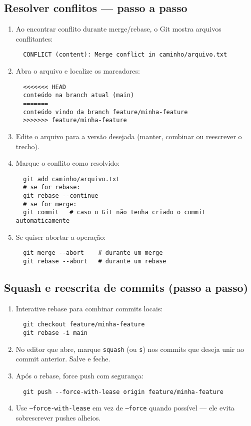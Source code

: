 \subsection{Resolver conflitos — passo a passo}
\begin{enumerate}
  \item Ao encontrar conflito durante merge/rebase, o Git mostra arquivos conflitantes:
  \begin{verbatim}
  CONFLICT (content): Merge conflict in caminho/arquivo.txt
  \end{verbatim}
  \item Abra o arquivo e localize os marcadores:
  \begin{verbatim}
  <<<<<<< HEAD
  conteúdo na branch atual (main)
  =======
  conteúdo vindo da branch feature/minha-feature
  >>>>>>> feature/minha-feature
  \end{verbatim}
  \item Edite o arquivo para a versão desejada (manter, combinar ou reescrever o trecho).
  \item Marque o conflito como resolvido:
  \begin{verbatim}
  git add caminho/arquivo.txt
  # se for rebase:
  git rebase --continue
  # se for merge:
  git commit   # caso o Git não tenha criado o commit automaticamente
  \end{verbatim}
  \item Se quiser abortar a operação:
  \begin{verbatim}
  git merge --abort    # durante um merge
  git rebase --abort   # durante um rebase
  \end{verbatim}
\end{enumerate}

\subsection{Squash e reescrita de commits (passo a passo)}
\begin{enumerate}
  \item Interative rebase para combinar commits locais:
  \begin{verbatim}
  git checkout feature/minha-feature
  git rebase -i main
  \end{verbatim}
  \item No editor que abre, marque \texttt{squash} (ou \texttt{s}) nos commits que deseja unir ao commit anterior. Salve e feche.
  \item Após o rebase, force push com segurança:
  \begin{verbatim}
  git push --force-with-lease origin feature/minha-feature
  \end{verbatim}
  \item Use \texttt{--force-with-lease} em vez de \texttt{--force} quando possível — ele evita sobrescrever pushes alheios.
\end{enumerate}

